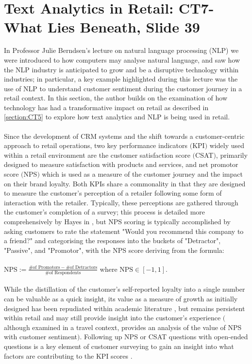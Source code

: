 \documentclass[11pt]{article}
\theoremstyle{plain}
\theoremstyle{definition}
\begin{document}
\section{Text Analytics in Retail: CT7-What Lies Beneath, Slide 39}\label{section:CT7}
In Professor Julie Berndsen's lecture on natural language processing (NLP) \cite{CT7} we were introduced to how computers may analyse natural language, and saw how the NLP industry is anticipated to grow and be a disruptive technology within industries; in particular, a key example highlighted during this lecture was the use of NLP to understand customer sentiment during the customer journey in a retail context. In this section, the author builds on the examination of how technology has had a transformative impact on retail as described in \ref{section:CT5} to explore how text analytics and NLP is being used in retail.\\
\\
Since the development of CRM systems and the shift towards a customer-centric approach to retail operations, two key performance indicators $($KPI$)$ widely used within a retail environment are the customer satisfaction score $($CSAT$)$, primarily designed to measure satisfaction with products and services, and net promotor score $($NPS$)$ which is used as a measure of the customer journey and the impact on their brand loyalty. Both KPIs share a commonality in that they are designed to measure the customer's perception of a retailer following some form of interaction with the retailer. Typically, these perceptions are gathered through the customer's completion of a survey; this process is detailed more comprehensively by Hayes in \cite{Hayes:2008aa}, but NPS scoring is typically accomplished by asking customers to rate the statement "Would you recommend this company to a friend?" and categorising the responses into the buckets of "Detractor", "Passive", and "Promotor", with the NPS score deriving from the formula:\\
\\
\begin{math}
\text{NPS}:=\frac{\# \text{of Promotors} - \# \text{of Detractors}} {\# \text{of Respondents}}
\end{math}
\cite{1158740720031201} where $\text{NPS} \in [-1,1]$.\\
\\
While the distillation of the customer's self-reported loyalty into a single number can be valuable as a quick insight, its value as a measure of growth as initially designed has been repudiated within academic literature \cite{Keiningham:2007aa}, but remains persistent within retail and may still provide insight into the customer's experience $($although examined in a travel context, \cite{14114988820200101} provides an analysis of the value of NPS with customer sentiment$)$. Following up NPS or CSAT questions with open-ended questions is a key element of customer surveying to gain an insight into what factors are contributing to the KPI scores \cite{Hayes:2008aa}.\\
\end{document}
